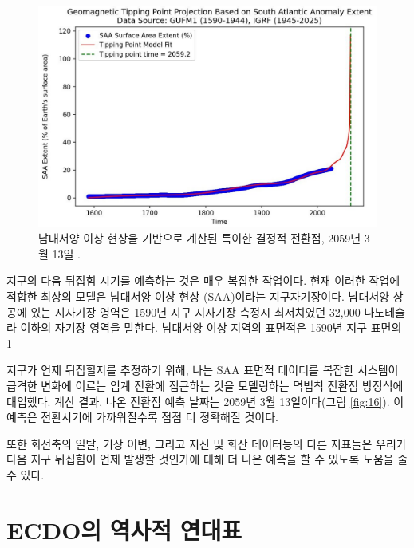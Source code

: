 \documentclass[10pt,twocolumn,letterpaper]{article}
\begin{document}
\begin{figure}[b]
\begin{center}
   \includegraphics[width=1\linewidth]{saa-crop.jpeg}
\end{center}
   \caption{남대서양 이상 현상을 기반으로 계산된 특이한 결정적 전환점, 2059년 3월 13일 \cite{125,126}.}
\label{fig:16}
\label{fig:onecol}
\end{figure}

지구의 다음 뒤집힘 시기를 예측하는 것은 매우 복잡한 작업이다. 현재 이러한 작업에 적합한 최상의 모델은 남대서양 이상 현상 (SAA)이라는 지구자기장이다. 남대서양 상공에 있는 지자기장 영역은 1590년 지구 지자기장 측정시 최저치였던 32,000 나노테슬라 \cite{135}이하의 자기장 영역을 말한다. 남대서양 이상 지역의 표면적은 1590년 지구 표면의 1%


지구가 언제 뒤집힐지를 추정하기 위해, 나는 SAA 표면적 데이터를 복잡한 시스템이 급격한 변화에 이르는 임계 전환에 접근하는 것을 모델링하는 멱법칙 전환점 방정식에 대입했다. 계산 결과, 나온 전환점 예측 날짜는 2059년 3월 13일이다(그림 \ref{fig:16}). 이 예측은 전환시기에 가까워질수록 점점 더 정확해질 것이다\cite{136}.

또한 회전축의 일탈, 기상 이변, 그리고 지진 및 화산 데이터등의 다른 지표들은 우리가 다음 지구 뒤집힘이 언제 발생할 것인가에 대해 더 나은 예측을 할 수 있도록 도움을 줄 수 있다.

\section{ECDO의 역사적 연대표}
\end{document}
